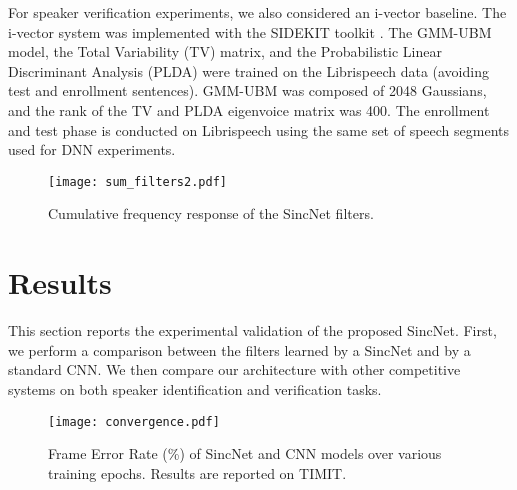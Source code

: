 \documentclass{article}
\begin{document}
For speaker verification experiments, we also considered an i-vector baseline. The i-vector system was implemented with the SIDEKIT toolkit \cite{sidekit}. The GMM-UBM model, the Total Variability (TV) matrix, and the Probabilistic Linear Discriminant Analysis (PLDA) were trained on the Librispeech data (avoiding test and enrollment sentences). GMM-UBM was composed of 2048 Gaussians, and the rank of the TV and PLDA eigenvoice matrix was 400. The enrollment and test phase is conducted on Librispeech using the same set of speech segments used for DNN experiments. 


 \begin{figure}[t!]
 \centering
   \texttt{[image: sum\_filters2.pdf]}
 \caption{Cumulative frequency response of the SincNet filters.}\label{fig:filt_sum_sum}
 \label{fig:cum}
 \end{figure}
 

 

 
\section{Results}
This section reports the experimental validation of the proposed SincNet. First, we perform a comparison between the filters learned by a SincNet and by a standard CNN. We then compare our architecture with other competitive systems on both speaker identification and verification tasks.

\label{sec:exp}


   \begin{figure}[t!]
 \centering
   \texttt{[image: convergence.pdf]}
 \caption{Frame Error Rate (\%) of SincNet and CNN models over various training epochs. Results are reported on TIMIT.}
 \label{fig:conv_curve}
 \end{figure}
 
\end{document}
